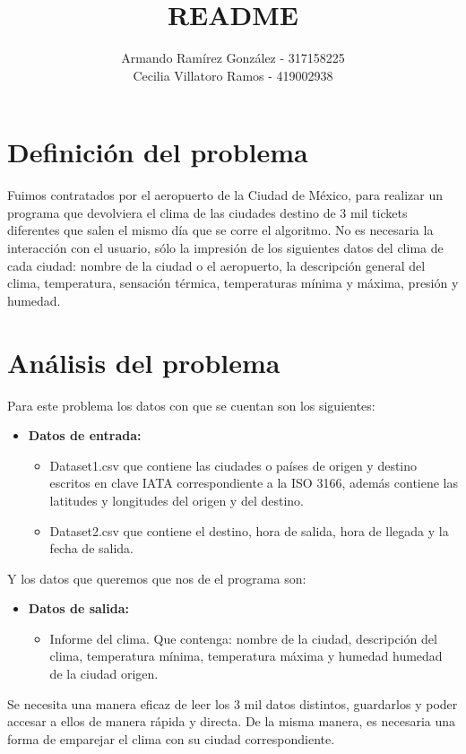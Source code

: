 \documentclass[]{article}
\title{README}
\author{Armando Ramírez González - 317158225 \\ Cecilia Villatoro Ramos 
- 419002938}
\begin{document}
\maketitle

\section{Definición del problema}
Fuimos contratados por el aeropuerto de la Ciudad de México, para realizar 
un programa que devolviera el clima de las ciudades destino de 3 mil tickets 
diferentes que salen el mismo día que se corre el algoritmo. No es necesaria 
la interacción con el usuario, sólo la impresión de los siguientes datos del 
clima de cada ciudad: nombre de la ciudad o el aeropuerto, la descripción 
general del clima, temperatura, sensación térmica, temperaturas mínima y 
máxima, presión y humedad.


\section{Análisis del problema}
Para este problema los datos con que se cuentan son los siguientes:
\begin{itemize}
	\item \textbf{Datos de entrada:}
	\begin{itemize}
		\item Dataset1.csv que contiene las ciudades o países de origen y 
		destino escritos en clave IATA correspondiente a la ISO 3166, además 
		contiene las latitudes y longitudes del origen y del destino.		
		\item Dataset2.csv que contiene el destino, hora de salida, hora de 
		llegada y la fecha de salida.
	\end{itemize}
\end{itemize}

Y los datos que queremos que nos de el programa son:
\begin{itemize}
	\item \textbf{Datos de salida:}
	\begin{itemize}
		\item Informe del clima. Que contenga: nombre de la ciudad, 
		descripción del clima, temperatura mínima, temperatura máxima y 
		humedad humedad de la ciudad origen.
	\end{itemize}
\end{itemize}

Se necesita una manera eficaz de leer los 3 mil datos distintos, guardarlos y 
poder accesar a ellos de manera rápida y directa. De la misma manera, es 
necesaria una forma de emparejar el clima con su ciudad correspondiente.
\end{document}
